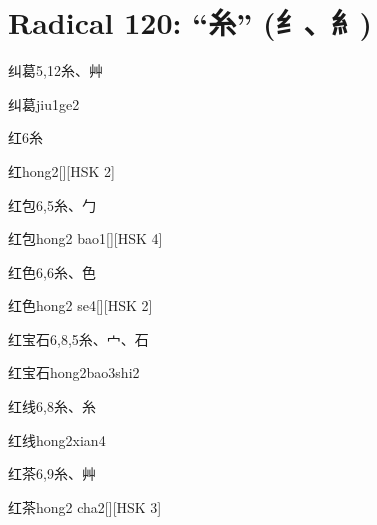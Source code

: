 
\section*{Radical 120: ``⽷'' (纟、糹)}

\begin{entry}{纠葛}{5,12}{⽷、⾋}
  \begin{phonetics}{纠葛}{jiu1ge2}
  \end{phonetics}
\end{entry}

\begin{entry}{红}{6}{⽷}
  \begin{phonetics}{红}{hong2}[][HSK 2]
  \end{phonetics}
\end{entry}

\begin{entry}{红包}{6,5}{⽷、⼓}
  \begin{phonetics}{红包}{hong2 bao1}[][HSK 4]
  \end{phonetics}
\end{entry}

\begin{entry}{红色}{6,6}{⽷、⾊}
  \begin{phonetics}{红色}{hong2 se4}[][HSK 2]
  \end{phonetics}
\end{entry}

\begin{entry}{红宝石}{6,8,5}{⽷、⼧、⽯}
  \begin{phonetics}{红宝石}{hong2bao3shi2}
  \end{phonetics}
\end{entry}

\begin{entry}{红线}{6,8}{⽷、⽷}
  \begin{phonetics}{红线}{hong2xian4}
  \end{phonetics}
\end{entry}

\begin{entry}{红茶}{6,9}{⽷、⾋}
  \begin{phonetics}{红茶}{hong2 cha2}[][HSK 3]
  \end{phonetics}
\end{entry}

